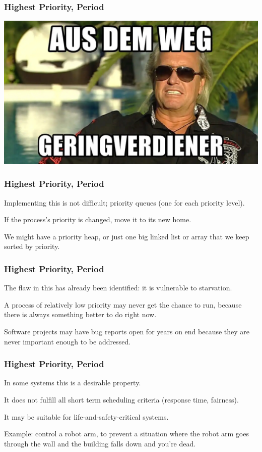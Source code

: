 \begin{frame}
\frametitle{Highest Priority, Period}

\begin{center}
	\includegraphics[width=\textwidth]{images/geringverdiener.jpg}
\end{center}

\end{frame}

\begin{frame}
\frametitle{Highest Priority, Period}

Implementing this is not difficult; priority queues (one for each priority level).
 
If the process's priority is changed, move it to its new home. 

We might have a priority heap, or just one big linked list or array that we keep sorted by priority.

\end{frame}



\begin{frame}
\frametitle{Highest Priority, Period}


The flaw in this has already been identified: it is vulnerable to starvation. 

A process of relatively low priority may never get the chance to run, because there is always something better to do right now. 

Software projects may have bug reports open for years on end because they are never important enough to be addressed.

\end{frame}

\begin{frame}
\frametitle{Highest Priority, Period}

In some systems this is a desirable property. 

It does not fulfill all short term scheduling criteria (response time, fairness). 

It may be suitable for life-and-safety-critical systems.

Example: control a robot arm, to prevent a situation where the robot arm goes through the wall and the building falls down and you're dead.


\end{frame}


